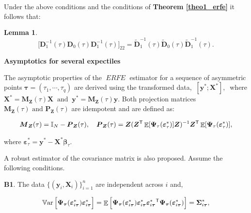 \documentclass[15pt,a4paper]{article}
\DeclareMathOperator{\Var}{\mathbb{V}\text{ar}}
\DeclareMathOperator{\E}{\mathbb{E}}
\newcommand{\transpose}{{}^{\text{\sffamily T}}}
\DeclareMathOperator{\ERFE}{\textit{ERFE}}
\newtheorem{lemma}{Lemma}%
\begin{document}
Under the above conditions and the conditions of \textbf{Theorem \ref{theo1_erfe}} it follows that:

\begin{lemma}\label{lem1_erfe}
\begin{equation*}
    \Big[\boldsymbol{D}_1^{-1}(\tau)\boldsymbol{D}_0 (\tau)\boldsymbol{D}_1^{-1}(\tau)\Big]_{22}=\widetilde{\boldsymbol{D}}_1^{-1}(\tau)\widetilde{\boldsymbol{D}}_0(\tau)
    \widetilde{\boldsymbol{D}}_1^{-1}(\tau).
\end{equation*}
\end{lemma}

\textbf{ Asymptotics for several expectiles }

The asymptotic properties of the $\ERFE$ estimator for a sequence of asymmetric points \(\boldsymbol{\tau}=(\tau_1,\cdots,\tau_q)\) are derived using the transformed data, \(\ [\boldsymbol{y}^{*};\boldsymbol{X}^{*}],\ \) where \(\boldsymbol{X}^{*}=\boldsymbol{M}_{\boldsymbol{Z}}(\tau)\boldsymbol{X} \ \mbox{ and } \ \boldsymbol{y}^{*} = \boldsymbol{M}_{\boldsymbol{Z}}(\tau)\boldsymbol{y}.\) Both
projection matrices \(\boldsymbol{M}_{\boldsymbol{Z}}(\tau) \mbox{ and } \boldsymbol{P}_{\boldsymbol{Z}}(\tau)\) are idempotent and are defined as:

\begin{equation*}
\boldsymbol{M}_{\boldsymbol{Z}}(\tau)=\mathbb{I}_{N}-\boldsymbol{P}_{\boldsymbol{Z}}(\tau), \quad
\boldsymbol{P}_{\boldsymbol{Z}}(\tau)=\boldsymbol{Z}(\boldsymbol{Z}\transpose
\E[\boldsymbol{\Psi}_{\tau}(\boldsymbol{\varepsilon}^{*}_{\tau})]\boldsymbol{Z})^{-1}\boldsymbol{Z}\transpose
\E[\boldsymbol{\Psi}_{\tau}(\boldsymbol{\varepsilon}^{*}_{\tau})],
\end{equation*}

where \(\boldsymbol{\varepsilon}^{*}_{\tau}=\boldsymbol{y}^{*}- \boldsymbol{X}^{*}\boldsymbol{\beta}_{\tau}.\)

A robust estimator of the covariance matrix is also proposed. Assume the following conditions.

\textbf{B1}. The data \(\lbrace (\boldsymbol{y}_i,\boldsymbol{X}_i) \rbrace_{i=1}^{n}\) are independent across \(i\) and,

\begin{equation*}
\Var\Big[\boldsymbol{\Psi}_{\boldsymbol{\tau}}(\boldsymbol{\varepsilon}_{i\boldsymbol{\tau}}^{*})
\boldsymbol{\varepsilon}_{i\boldsymbol{\tau}}^{*}\Big]= \E\Big[\boldsymbol{\Psi}_{\boldsymbol{\tau}}(\boldsymbol{\varepsilon}_{i\boldsymbol{\tau}}^{*})
\boldsymbol{\varepsilon}_{i\boldsymbol{\tau}}^{*}
\boldsymbol{\varepsilon}_{i\boldsymbol{\tau}}^{*}\transpose
\boldsymbol{\Psi}_{\boldsymbol{\tau}}(\boldsymbol{\varepsilon}_{i\boldsymbol{\tau}}^{*}) \Big]=\boldsymbol{\Sigma}_{i\boldsymbol{\tau}}^{*}, 
\end{equation*}
\end{document}
